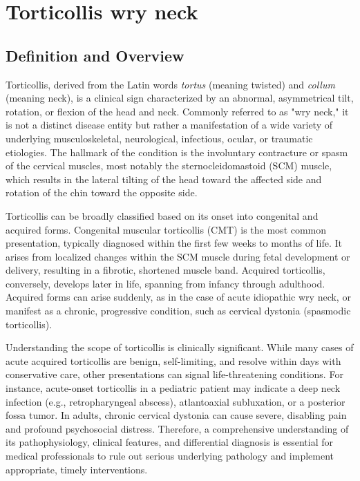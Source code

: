 \chapter{Torticollis wry neck}

\section*{Definition and Overview}
Torticollis, derived from the Latin words \textit{tortus} (meaning twisted) and \textit{collum} (meaning neck), is a clinical sign characterized by an abnormal, asymmetrical tilt, rotation, or flexion of the head and neck. Commonly referred to as "wry neck," it is not a distinct disease entity but rather a manifestation of a wide variety of underlying musculoskeletal, neurological, infectious, ocular, or traumatic etiologies. The hallmark of the condition is the involuntary contracture or spasm of the cervical muscles, most notably the sternocleidomastoid (SCM) muscle, which results in the lateral tilting of the head toward the affected side and rotation of the chin toward the opposite side.

Torticollis can be broadly classified based on its onset into congenital and acquired forms. Congenital muscular torticollis (CMT) is the most common presentation, typically diagnosed within the first few weeks to months of life. It arises from localized changes within the SCM muscle during fetal development or delivery, resulting in a fibrotic, shortened muscle band. Acquired torticollis, conversely, develops later in life, spanning from infancy through adulthood. Acquired forms can arise suddenly, as in the case of acute idiopathic wry neck, or manifest as a chronic, progressive condition, such as cervical dystonia (spasmodic torticollis).

Understanding the scope of torticollis is clinically significant. While many cases of acute acquired torticollis are benign, self-limiting, and resolve within days with conservative care, other presentations can signal life-threatening conditions. For instance, acute-onset torticollis in a pediatric patient may indicate a deep neck infection (e.g., retropharyngeal abscess), atlantoaxial subluxation, or a posterior fossa tumor. In adults, chronic cervical dystonia can cause severe, disabling pain and profound psychosocial distress. Therefore, a comprehensive understanding of its pathophysiology, clinical features, and differential diagnosis is essential for medical professionals to rule out serious underlying pathology and implement appropriate, timely interventions.


